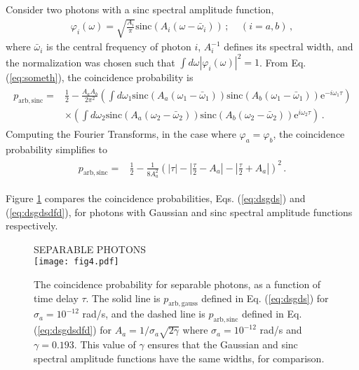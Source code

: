 \documentclass[12pt]{article}
\newcommand{\ee}[1] {\mathrm{e}^{#1}}
\begin{document}
Consider two photons with a sinc spectral amplitude function, 
\begin{align}
\varphi_i(\omega)=\sqrt{\frac{A_i}{\pi}}\mathrm{sinc}\left(A_i (\omega-\bar\omega_i)\right)\,; ~~~~~(i=a,b)\,,
\end{align} 
where $\bar\omega_i$ is the central frequency of photon $i$, $A_i^{-1}$ defines its spectral width, and the normalization was chosen such that $\int d\omega |\varphi_i(\omega)|^2=1$. From Eq. (\ref{eq:someth}), the coincidence probability is
\begin{align}
\begin{split}
p_{\mathrm{arb,sinc}}={}&\frac{1}{2}-\frac{A_aA_b}{2 \pi^2 }\left(\int d\omega_{1} \mathrm{sinc}\left(A_a(\omega_1-\bar\omega_1)\right)\mathrm{sinc}\left(A_b(\omega_1-\bar\omega_1)\right)\ee{-i\omega_{1} \tau}\right)\\
&\times\left(\int d\omega_{2} \mathrm{sinc}\left(A_a(\omega_2-\bar\omega_2)\right)\mathrm{sinc}\left(A_b (\omega_2-\bar\omega_2)\right) \ee{i\omega_2 \tau}\right)\,.
\end{split}
\end{align}
Computing the Fourier Transforms, in the case where $\varphi_a=\varphi_b$, the coincidence probability simplifies to
\begin{align}\label{eq:dsgdsdfd}
\begin{split}
p_{\mathrm{arb,sinc}}={}&\frac{1}{2}-\frac{1}{8A_a^2} \left(  |\tau| -\left|\frac{ \tau}{2} -A_a\right| -\left|\frac{  \tau}{2} +A_a\right|\right)^2\,.
\end{split}
\end{align}

Figure \ref{fig:arbhom} compares the coincidence probabilities, Eqs. (\ref{eq:dsgds}) and (\ref{eq:dsgdsdfd}), for photons with Gaussian and sinc spectral amplitude functions respectively. 


\begin{figure}[h]
\begin{center}
SEPARABLE PHOTONS\\
\texttt{[image: fig4.pdf]}
\caption{The coincidence probability for separable photons, as a function of time delay $\tau$.  The solid line is  $p_{\mathrm{arb,gauss}}$ defined in Eq.  (\ref{eq:dsgds}) for $\sigma_a=10^{-12}$ rad/s, and the dashed line is $p_{\mathrm{arb,sinc}}$ defined in Eq. (\ref{eq:dsgdsdfd}) for $A_a=1/\sigma_a\sqrt{2\gamma}$ where $\sigma_a=10^{-12}$ rad/s and $\gamma=0.193$. This value of $\gamma$ ensures that the Gaussian and sinc spectral amplitude functions have the same widths, for comparison. }
\label{fig:arbhom}
\end{center}
\end{figure}
\end{document}
